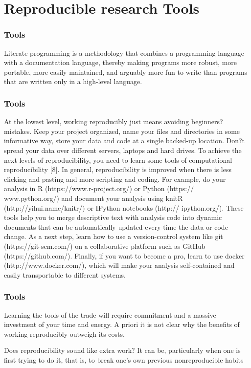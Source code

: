 \documentclass{beamer}
\begin{document}
\section{Reproducible research Tools}

\begin{frame}
\frametitle{Tools}
Literate programming is a methodology that combines a programming language with a documentation language, thereby making programs more robust, more portable, more easily maintained, and arguably more fun to write than programs that are written only in a high-level language.
\end{frame}


\begin{frame}
\frametitle{Tools}
At the lowest level, working reproducibly just means avoiding beginners? mistakes. Keep your project organized, name your files and directories in some informative way, store your data and code at a single backed-up location. Don?t spread your data over different servers, laptops and hard drives.
To achieve the next levels of reproducibility, you need to learn some tools of computational reproducibility [8]. In general, reproducibility is improved when there is less clicking and pasting and more scripting and coding. For example, do your analysis in R (https://www.r-project.org/) or Python (https:// www.python.org/) and document your analysis using knitR (http://yihui.name/knitr/) or IPython notebooks (http:// ipython.org/). These tools help you to merge descriptive text with analysis code into dynamic documents that can be automatically updated every time the data or code change.
As a next step, learn how to use a version-control system like git (https://git-scm.com/) on a collaborative platform such as GitHub (https://github.com/). Finally, if you want to become a pro, learn to use docker (http://www.docker.com/), which will make your analysis self-contained and easily transportable to different systems.
\end{frame}


\begin{frame}
\frametitle{Tools}


Learning the tools of the trade will require commitment and a massive investment of your time and energy. A priori it is not clear why the benefits of working reproducibly outweigh its costs.

Does reproducibility sound like extra work? It can be, particularly when one is first trying to do it, that is, to break one's own previous nonreproducible habits


\end{frame}
\end{document}
